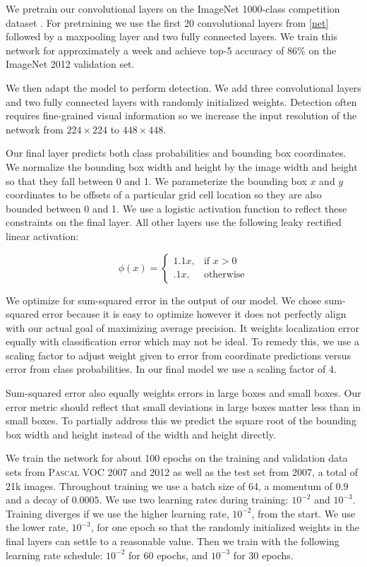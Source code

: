 \documentclass{article} %
\begin{document}
We pretrain our convolutional layers on the ImageNet 1000-class competition dataset \cite{ILSVRC15}. For pretraining we use the first 20 convolutional layers from \ref{net} followed by a maxpooling layer and two fully connected layers. We train this network for approximately a week and achieve top-5 accuracy of 86\% on the ImageNet 2012 validation set.

We then adapt the model to perform detection. We add three convolutional layers and two fully connected layers with randomly initialized weights. Detection often requires fine-grained visual information so we increase the input resolution of the network from $224 \times 224$ to $448 \times 448$.

Our final layer predicts both class probabilities and bounding box coordinates. We normalize the bounding box width and height by the image width and height so that they fall between 0 and 1. We parameterize the bounding box $x$ and $y$ coordinates to be offsets of a particular grid cell location so they are also bounded between 0 and 1. We use a logistic activation function to reflect these constraints on the final layer. All other layers use the following leaky rectified linear activation:

\begin{equation}
\phi(x) =
\begin{cases}
    1.1x, & \text{if } x > 0\\
    .1x, & \text{otherwise}
    \end{cases}
\end{equation}

We optimize for sum-squared error in the output of our model. We chose sum-squared error because it is easy to optimize however it does not perfectly align with our actual goal of maximizing average precision. It weights localization error equally with classification error which may not be ideal. To remedy this, we use a scaling factor to adjust weight given to error from coordinate predictions versus error from class probabilities. In our final model we use a scaling factor of 4.

Sum-squared error also equally weights errors in large boxes and small boxes. Our error metric should reflect that small deviations in large boxes matter less than in small boxes. To partially address this we predict the square root of the bounding box width and height instead of the width and height directly.

We train the network for about 100 epochs on the training and validation data sets from \textsc{Pascal} VOC 2007 and 2012 as well as the test set from 2007, a total of 21k images. Throughout training we use a batch size of 64, a momentum of $0.9$ and a decay of $0.0005$. We use two learning rates during training: $10^{-2}$ and $10^{-3}$. Training diverges if we use the higher learning rate, $10^{-2}$, from the start. We use the lower rate, $10^{-3}$, for one epoch so that the randomly initialized weights in the final layers can settle to a reasonable value. Then we train with the following learning rate schedule: $10^{-2}$ for 60 epochs, and $10^{-3}$ for 30 epochs.
\end{document}
